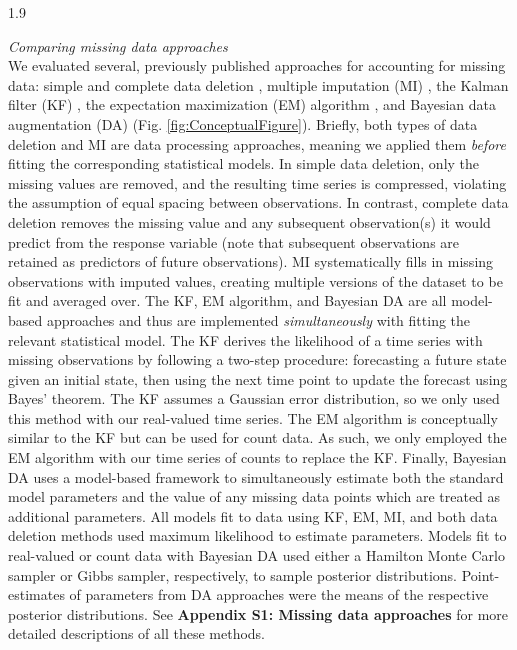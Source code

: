 \documentclass[12pt,english]{article} %
\begin{document}
\begin{linenumbers}
\begin{spacing}{1.9}
\begin{flushleft}
\textit{Comparing missing data approaches} \\
\noindent We evaluated several, previously published approaches for accounting for missing data: simple and complete data deletion \citep{nakagawa_model_2011}, multiple imputation (MI) \citep{rubin1988overview}, the Kalman filter (KF) \citep{kalman_filter_1960}, the expectation maximization (EM) algorithm \citep{kang2013prevention}, and Bayesian data augmentation (DA) \citep{kong_sequential_1994} (Fig. \ref{fig:ConceptualFigure}).  Briefly, both types of data deletion and MI are data processing approaches, meaning we applied them \textit{before} fitting the corresponding statistical models. In simple data deletion, only the missing values are removed, and the resulting time series is compressed, violating the assumption of equal spacing between observations. In contrast, complete data deletion removes the missing value and any subsequent observation(s) it would predict from the response variable (note that subsequent observations are retained as predictors of future observations). MI systematically fills in missing observations with imputed values, creating multiple versions of the dataset to be fit and averaged over. The KF, EM algorithm, and Bayesian DA are all model-based approaches and thus are implemented \textit{simultaneously} with fitting the relevant statistical model. The KF derives the likelihood of a time series with missing observations by following a two-step procedure: forecasting a future state given an initial state, then using the next time point to update the forecast using Bayes’ theorem. The KF assumes a Gaussian error distribution, so we only used this method with our real-valued time series. The EM algorithm is conceptually similar to the KF but can be used for count data. As such, we only employed the EM algorithm with our time series of counts to replace the KF. Finally, Bayesian DA uses a model-based framework to simultaneously estimate both the standard model parameters and the value of any missing data points which are treated as additional parameters. All models fit to data using KF, EM, MI, and both data deletion methods used maximum likelihood to estimate parameters. Models fit to real-valued or count data with Bayesian DA used either a Hamilton Monte Carlo sampler or Gibbs sampler, respectively, to sample posterior distributions. Point-estimates of parameters from DA approaches were the means of the respective posterior distributions. See \textbf{Appendix S1: Missing data approaches} for more detailed descriptions of all these methods. 


\end{flushleft}
\end{spacing}
\end{linenumbers}
\end{document}
